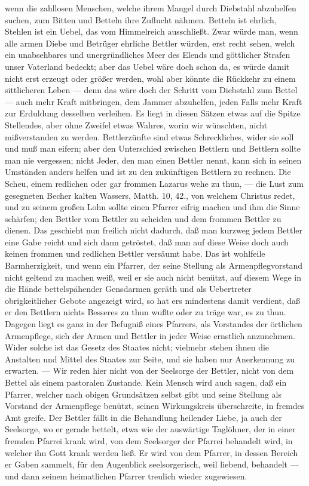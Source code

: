 wenn die zahllosen Menschen, welche ihrem Mangel durch Diebstahl abzuhelfen suchen, zum Bitten und Betteln ihre Zuflucht nähmen. Betteln ist ehrlich, Stehlen ist ein Uebel, das vom Himmelreich ausschließt. Zwar würde man, wenn alle armen Diebe und Betrüger ehrliche Bettler würden, erst recht sehen, welch ein unabsehbares und unergründliches Meer des Elends und göttlicher Strafen unser Vaterland bedeckt; aber das Uebel wäre doch schon da, es würde damit nicht erst erzeugt oder größer werden, wohl aber könnte die Rückkehr zu einem sittlicheren Leben — denn das wäre doch der Schritt vom Diebstahl zum Bettel — auch mehr Kraft mitbringen, dem Jammer abzuhelfen, jeden Falls mehr Kraft zur Erduldung desselben verleihen. Es liegt in diesen Sätzen etwas auf die Spitze Stellendes, aber ohne Zweifel etwas Wahres, worin wir wünschten, nicht mißverstanden zu werden. Bettlerzünfte sind etwas Schreckliches, wider sie soll und muß man eifern; aber den Unterschied zwischen Bettlern und Bettlern sollte man nie vergessen; nicht Jeder, den man einen Bettler nennt, kann sich in seinen Umständen anders helfen und ist zu den zukünftigen Bettlern zu rechnen. Die Scheu, einem redlichen oder gar frommen Lazarus wehe zu thun, — die Lust zum gesegneten Becher kalten Wassers, Matth. 10, 42., von welchem Christus redet, und zu seinem großen Lohn sollte einen Pfarrer eifrig machen und ihm die Sinne schärfen; den Bettler vom Bettler zu scheiden und dem frommen Bettler zu dienen. Das geschieht nun freilich nicht dadurch, daß man kurzweg jedem Bettler eine Gabe reicht und sich dann getröstet, daß man auf diese Weise
doch auch keinen frommen und redlichen Bettler versäumt habe. Das ist wohlfeile Barmherzigkeit, und wenn ein Pfarrer, der seine Stellung als Armenpflegvorstand nicht geltend zu machen weiß, weil er sie auch nicht benützt, auf diesem Wege in die Hände bettelspähender Gensdarmen geräth und als Uebertreter obrigkeitlicher Gebote angezeigt wird, so hat ers mindestens damit verdient, daß er den Bettlern nichts Besseres zu thun wußte oder zu träge war, es zu thun. Dagegen liegt es ganz in der Befugniß eines Pfarrers, als Vorstandes der örtlichen Armenpflege, sich der Armen und Bettler in jeder Weise ernstlich anzunehmen. Wider solche ist das Gesetz des Staates nicht; vielmehr stehen ihnen die Anstalten und Mittel des Staates zur Seite, und sie haben nur Anerkennung zu erwarten. — Wir reden hier nicht von der Seelsorge der Bettler, nicht von dem Bettel als einem pastoralen Zustande. Kein Mensch wird auch sagen, daß ein Pfarrer, welcher nach obigen Grundsätzen selbst gibt und seine Stellung als Vorstand der Armenpflege benützt, seinen Wirkungskreis überschreite, in fremdes Amt greife. Der Bettler fällt in die Behandlung heilender Liebe, ja auch der Seelsorge, wo er gerade bettelt, etwa wie der auswärtige Taglöhner, der in einer fremden Pfarrei krank wird, von dem Seelsorger der Pfarrei behandelt wird, in welcher ihn Gott krank werden ließ. Er wird von dem Pfarrer, in dessen Bereich er Gaben sammelt, für den Augenblick seelsorgerisch, weil liebend, behandelt — und dann seinem heimatlichen Pfarrer treulich wieder zugewiesen.

